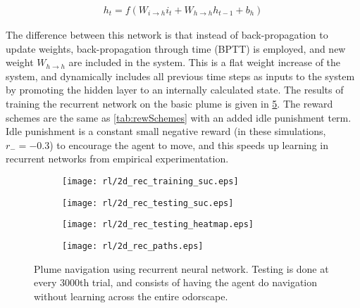 \documentclass[../dissertation.tex]{subfiles}
\begin{document}
\begin{align} \label{eqn:recinput}
    h_t = f \left(
        W_{i \rightarrow h} i_t + W_{h \rightarrow h} h_{t-1} + b_h \right)
\end{align}

The difference between this network is that instead of back-propagation to update weights, back-propagation through time (BPTT) is employed, and new weight $W_{h \rightarrow h}$ are included in the system.
This is a flat weight increase of the system, and dynamically includes all previous time steps as inputs to the system by promoting the hidden layer to an internally calculated state.
The results of training the recurrent network on the basic plume is given in \cref{fig:2drec_results}.
The reward schemes are the same as \cref{tab:rewSchemes} with an added idle punishment term.
Idle punishment is a constant small negative reward (in these simulations, $r_{-} = -0.3$) to encourage the agent to move, and this speeds up learning in recurrent networks from empirical experimentation.

\begin{figure}[p]
    \centering
    \begin{subfigure}[h]{0.45\textwidth}
        \texttt{[image: rl/2d\_rec\_training\_suc.eps]}
        \label{fig:2drec_trainSuc}
    \end{subfigure}
    \hfill
    \begin{subfigure}[h]{0.45\textwidth}
        \texttt{[image: rl/2d\_rec\_testing\_suc.eps]}
        \label{fig:2drec_testSuc}
    \end{subfigure}
    
    \par\bigskip

    \begin{subfigure}[b]{0.55\textwidth}
        \texttt{[image: rl/2d\_rec\_testing\_heatmap.eps]}
        \label{fig:2drec_testMap}
    \end{subfigure}
    \hfill
    \begin{subfigure}[b]{0.35\textwidth}
        \texttt{[image: rl/2d\_rec\_paths.eps]}
        \label{fig:2drec_testPath}
    \end{subfigure}
    
    \caption{Plume navigation using recurrent neural network. Testing is done at every 3000th trial, and consists of having the agent do navigation without learning across the entire odorscape.}
    \label{fig:2drec_results}
\end{figure}
\end{document}
